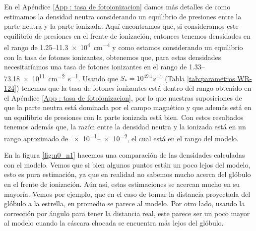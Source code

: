 \documentclass{book}
\begin{document}
En el Apéndice \ref{App : tasa de fotoionizacion} damos más detalles de como estimamos la densidad neutra considerando un equilibrio de presiones entre la parte neutra y la parte ionizada. Aquí encontramos que, si consideramos este equilibrio de presiones en el frente de ionización, entonces tenemos densidades en el rango de 1.25--\SI{11.3e4}{cm^{-4}} y como estamos considerando un equilibrio con la tasa de fotones ionizantes, obtenemos que, para estas densidades necesitaríamos una tasa de fotones ionizantes en el rango de 1.33--\SI{73.18e11}{cm^{-2}.s^{-1}}. Usando que $S_*=10^{49.1}\unit{s^{-1}}$ (Tabla \ref{tab:parametros WR-124}) tenemos que la tasa de fotones ionizantes está dentro del rango obtenido en el Apéndice \ref{App : tasa de fotoionizacion}, por lo que nuestras suposiciones de que la parte neutra está dominada por el campo magnético y que además está en un equilibrio de presiones con la parte ionizada está bien. Con estos resultados tenemos además que, la razón entre la densidad neutra y la ionizada está en un rango aproximado de \num{e-1}--\SI{e-2}{}, el cual está en el rango del modelo. 

En la figura \ref{fig:n0_n1} hacemos una comparación de las densidades calculadas con el modelo. Vemos que si bien algunos puntos están un poco lejos del modelo, esto es pura estimación, ya que en realidad no sabemos mucho acerca del glóbulo en el frente de ionización. Aún así, estas estimaciones se acercan mucho en su mayoría. Vemos por ejemplo, que en el caso de tomar la distancia proyectada del glóbulo a la estrella, en promedio se parece al modelo. Por otro lado, usando la corrección por ángulo para tener la distancia real, este parece ser un poco mayor al modelo cuando la cáscara chocada se encuentra más lejos del glóbulo.
\end{document}
